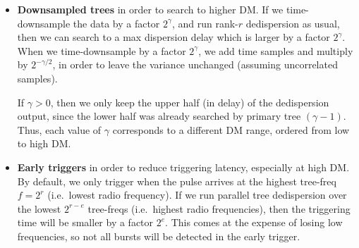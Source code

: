 \documentclass{article}
\numberwithin{equation}{section}   %
\begin{document}
\begin{itemize}

\item {\bf Downsampled trees} in order to search to higher DM. 
If we time-downsample the data by a factor $2^\gamma$, and run rank-$r$ dedispersion as usual, then we can search to a max dispersion delay which is larger by a factor $2^\gamma$.
When we time-downsample by a factor $2^\gamma$, we add time samples and multiply by $2^{-\gamma/2}$, in order to leave the variance unchanged (assuming uncorrelated samples).

If $\gamma > 0$, then we only keep the upper half (in delay) of the dedispersion output, since the lower half was already searched by primary tree $(\gamma-1)$.
Thus, each value of $\gamma$ corresponds to a different DM range, ordered from low to high DM.

\item {\bf Early triggers} in order to reduce triggering latency, especially at high DM. 
By default, we only trigger when the pulse arrives at the highest tree-freq $f=2^r$ (i.e.\ lowest radio frequency).
If we run parallel tree dedispersion over the lowest $2^{r-e}$ tree-freqs (i.e.\ highest radio frequencies),
then the triggering time will be smaller by a factor $2^e$.
This comes at the expense of losing low frequencies, so not all bursts will be detected in the early trigger.

\end{itemize}
\end{document}
